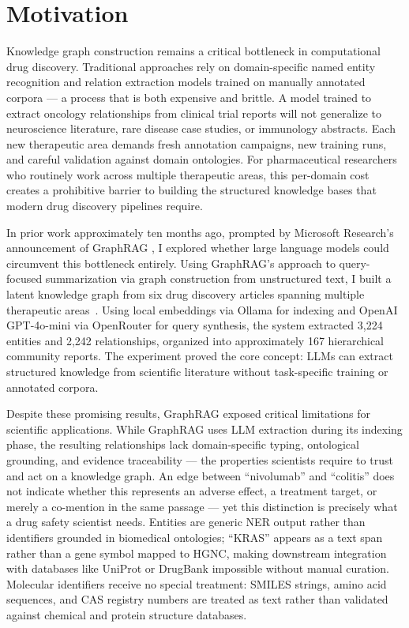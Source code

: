 \section{Motivation}

Knowledge graph construction remains a critical bottleneck in computational drug discovery. Traditional approaches rely on domain-specific named entity recognition and relation extraction models trained on manually annotated corpora --- a process that is both expensive and brittle. A model trained to extract oncology relationships from clinical trial reports will not generalize to neuroscience literature, rare disease case studies, or immunology abstracts. Each new therapeutic area demands fresh annotation campaigns, new training runs, and careful validation against domain ontologies. For pharmaceutical researchers who routinely work across multiple therapeutic areas, this per-domain cost creates a prohibitive barrier to building the structured knowledge bases that modern drug discovery pipelines require.

In prior work approximately ten months ago, prompted by Microsoft Research's announcement of GraphRAG \cite{edge2024graphrag}, I explored whether large language models could circumvent this bottleneck entirely. Using GraphRAG's approach to query-focused summarization via graph construction from unstructured text, I built a latent knowledge graph from six drug discovery articles spanning multiple therapeutic areas~\cite{bhatt2025latentkg}. Using local embeddings via Ollama for indexing and OpenAI GPT-4o-mini via OpenRouter for query synthesis, the system extracted 3,224 entities and 2,242 relationships, organized into approximately 167 hierarchical community reports. The experiment proved the core concept: LLMs can extract structured knowledge from scientific literature without task-specific training or annotated corpora.

Despite these promising results, GraphRAG exposed critical limitations for scientific applications. While GraphRAG uses LLM extraction during its indexing phase, the resulting relationships lack domain-specific typing, ontological grounding, and evidence traceability --- the properties scientists require to trust and act on a knowledge graph. An edge between ``nivolumab'' and ``colitis'' does not indicate whether this represents an adverse effect, a treatment target, or merely a co-mention in the same passage --- yet this distinction is precisely what a drug safety scientist needs. Entities are generic NER output rather than identifiers grounded in biomedical ontologies; ``KRAS'' appears as a text span rather than a gene symbol mapped to HGNC, making downstream integration with databases like UniProt or DrugBank impossible without manual curation. Molecular identifiers receive no special treatment: SMILES strings, amino acid sequences, and CAS registry numbers are treated as text rather than validated against chemical and protein structure databases.

